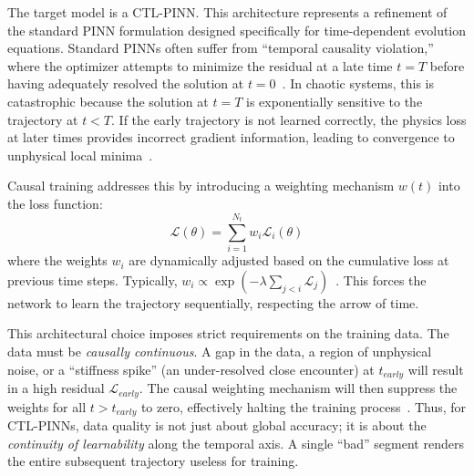 The target model is a CTL-PINN. This architecture represents a refinement of the standard PINN formulation designed specifically for time-dependent evolution equations. Standard PINNs often suffer from ``temporal causality violation,'' where the optimizer attempts to minimize the residual at a late time $t=T$ before having adequately resolved the solution at $t=0$~\cite{ref10}. In chaotic systems, this is catastrophic because the solution at $t=T$ is exponentially sensitive to the trajectory at $t < T$. If the early trajectory is not learned correctly, the physics loss at later times provides incorrect gradient information, leading to convergence to unphysical local minima~\cite{ref10}.

Causal training addresses this by introducing a weighting mechanism $w(t)$ into the loss function:
\begin{equation}
    \mathcal{L}(\theta) = \sum_{i=1}^{N_t} w_i \mathcal{L}_i(\theta)
\end{equation}
where the weights $w_i$ are dynamically adjusted based on the cumulative loss at previous time steps. Typically, $w_i \propto \exp(-\lambda \sum_{j < i} \mathcal{L}_j)$~\cite{ref10}. This forces the network to learn the trajectory sequentially, respecting the arrow of time.

This architectural choice imposes strict requirements on the training data. The data must be \textit{causally continuous}. A gap in the data, a region of unphysical noise, or a ``stiffness spike'' (an under-resolved close encounter) at $t_{early}$ will result in a high residual $\mathcal{L}_{early}$. The causal weighting mechanism will then suppress the weights for all $t > t_{early}$ to zero, effectively halting the training process~\cite{ref10}. Thus, for CTL-PINNs, data quality is not just about global accuracy; it is about the \textit{continuity of learnability} along the temporal axis. A single ``bad'' segment renders the entire subsequent trajectory useless for training.